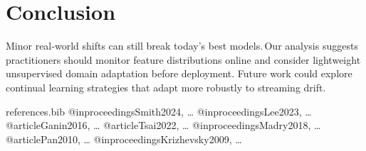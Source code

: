 \section{Conclusion}
Minor real‐world shifts can still break today's best models. Our analysis suggests practitioners should monitor feature distributions online and consider lightweight unsupervised domain adaptation before deployment. Future work could explore continual learning strategies that adapt more robustly to streaming drift.


\begin{filecontents}{references.bib}
@inproceedings{Smith2024, …}
@inproceedings{Lee2023, …}
@article{Ganin2016, …}
@article{Tsai2022, …}
@inproceedings{Madry2018, …}
@article{Pan2010, …}
@inproceedings{Krizhevsky2009, …}
\end{filecontents}

